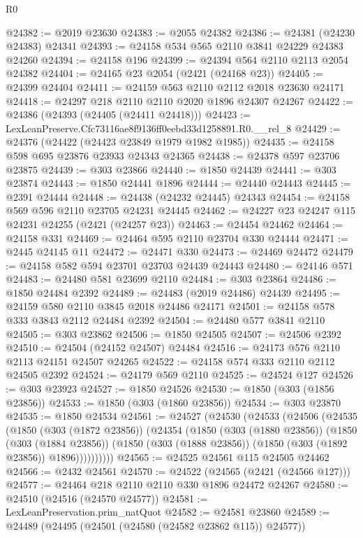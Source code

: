 \begin{lexlean}{R0}
\begin{coremodule}
@24382 := @2019 @23630
@24383 := @2055 @24382
@24386 := @24381 (@24230 @24383) @24341
@24393 := @24158 @534 @565 @2110 @3841 @24229 @24383 @24260
@24394 := @24158 @196
@24399 := @24394 @564 @2110 @2113 @2054 @24382
@24404 := @24165 @23 @2054 (@2421 (@24168 @23))
@24405 := @24399 @24404
@24411 := @24159 @563 @2110 @2112 @2018 @23630 @24171
@24418 := @24297 @218 @2110 @2110 @2020 @1896 @24307 @24267
@24422 := @24386 (@24393 (@24405 (@24411 @24418)))
@24423 := LexLeanPreserve.Cfc73116ae8f9136ff0eebd33d1258891.R0.__rel_8
@24429 := @24376 (@24422 (@24423 @23849 @1979 @1982 @1985))
@24435 := @24158 @598 @695 @23876 @23933 @24343 @24365
@24438 := @24378 @597 @23706 @23875
@24439 := @303 @23866
@24440 := @1850 @24439
@24441 := @303 @23874
@24443 := @1850 @24441 @1896
@24444 := @24440 @24443
@24445 := @2391 @24444
@24448 := @24438 (@24232 @24445) @24343
@24454 := @24158 @569 @596 @2110 @23705 @24231 @24445
@24462 := @24227 @23 @24247 @115 @24231 @24255 (@2421 (@24257 @23))
@24463 := @24454 @24462
@24464 := @24158 @331
@24469 := @24464 @595 @2110 @23704 @330 @24444
@24471 := @2445 @24145 @11
@24472 := @24471 @330
@24473 := @24469 @24472
@24479 := @24158 @582 @594 @23701 @23703 @24439 @24443
@24480 := @24146 @571
@24483 := @24480 @581 @23699 @2110
@24484 := @303 @23864
@24486 := @1850 @24484 @2392
@24489 := @24483 (@2019 @24486) @24439
@24495 := @24159 @580 @2110 @3845 @2018 @24486 @24171
@24501 := @24158 @578 @333 @3843 @2112 @24484 @2392
@24504 := @24480 @577 @3841 @2110
@24505 := @303 @23862
@24506 := @1850 @24505
@24507 := @24506 @2392
@24510 := @24504 (@24152 @24507) @24484
@24516 := @24173 @576 @2110 @2113 @24151 @24507 @24265
@24522 := @24158 @574 @333 @2110 @2112 @24505 @2392
@24524 := @24179 @569 @2110
@24525 := @24524 @127
@24526 := @303 @23923
@24527 := @1850 @24526
@24530 := @1850 (@303 (@1856 @23856))
@24533 := @1850 (@303 (@1860 @23856))
@24534 := @303 @23870
@24535 := @1850 @24534
@24561 := @24527
    (@24530
      (@24533
        (@24506
          (@24535
            (@1850
              (@303 (@1872 @23856))
              (@24354
                (@1850
                  (@303 (@1880 @23856))
                  (@1850
                    (@303 (@1884 @23856))
                    (@1850 (@303 (@1888 @23856)) (@1850 (@303 (@1892 @23856)) @1896))))))))))
@24565 := @24525 @24561 @115 @24505 @24462
@24566 := @2432 @24561
@24570 := @24522 (@24565 (@2421 (@24566 @127)))
@24577 := @24464 @218 @2110 @2110 @330 @1896 @24472 @24267
@24580 := @24510 (@24516 (@24570 @24577))
@24581 := LexLeanPreservation.prim_natQuot
@24582 := @24581 @23860
@24589 := @24489 (@24495 (@24501 (@24580 (@24582 @23862 @115)) @24577))

\end{coremodule}
\end{lexlean}
